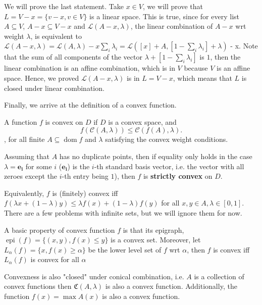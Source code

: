 We will prove the last statement. Take \( x \in V \), we will prove that \( L = V -
x = \{v - x, v \in V\}  \) is a linear space. This is true, since for every
list  \( A \subseteq V \), \( A - x \subseteq V - x \) and \( \mathcal{L}(A   -
x, \lambda) \), the linear combination of \( A-x \) wrt weight \( \lambda \),
is equivalent to \( \mathcal{L}(A-x, \lambda)  = \mathcal{L}(A, \lambda) - x
\sum_{i} \lambda_{i} = \mathcal{L}\left([x] + A, [1 - \sum_{i}
  \lambda_{i}] + \lambda\right)\) - x. Note that the sum of all components of the
  vector \(\lambda + [1 - \sum_{i} \lambda_{i}] \) is \( 1 \), then the linear
  combination is an affine combination, which is in \( V \) because \( V \) is an
  affine space. Hence, we proved \( \mathcal{L}(A-x, \lambda) \) is in \( L = V - x
  \), which means that \( L \) is closed under linear combination.


Finally, we arrive at the definition of a convex function.

\begin{definition}
  A function \( f \) is convex on \( D \) if \( D \) is a convex space, and
  \[
    f(\mathcal{C}(A, \lambda)) \le \mathcal{C}(f(A), \lambda)
  .\] , for all finite \( A \subseteq \operatorname{dom} f \) and \( \lambda \)
  satisfying the convex weight conditions.

  Assuming that \( A \) has no duplicate points, then if
  equality only holds in the case \( \lambda = \mathbf{e_{i}} \) for some \(
  i\) (\( \mathbf{e_{i}} \)) is the \( i \)-th standard basis vector, i.e. the
  vector with all zeroes except the \( i \)-th entry being \( 1 \)), then \( f
  \) is \textbf{strictly convex} on \( D \).
\end{definition}

Equivalently, \( f \) is (finitely) convex iff \( f(\lambda x + (1-\lambda)y) \le \lambda
f(x) + (1 - \lambda)f(y) \) for all \( x, y \in A, \lambda \in [0, 1] \).
There are a few problems with infinite sets, but we
will ignore them for now.

A basic property of convex function \( f \) is that its epigraph, \(
\operatorname{epi}(f) = \{(x, y), f(x) \le  y\}   \) is a convex set. Moreover,
let \( L_{\alpha}(f)= \{x, f(x) \ge  \alpha\}   \) be the lower level set of \(
f\) wrt \( \alpha \), then \( f \) is convex iff \( L_{\alpha}(f) \) is convex
for all \( \alpha \)

Convexness is also "closed" under conical combination, i.e. \( A \) is a
collection of convex functions then \( \mathfrak{C}(A, \lambda) \) is also a
convex function. Additionally, the function \( f(x) = \max A(x) \) is also a
convex function.


